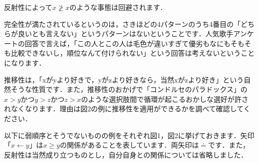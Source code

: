 反射性によって$x \not \geq x$のような事態は回避されます．

完全性が満たされているというのは，さきほどの4パターンのうち4番目の「どちらが良いとも言えない」というパターンはないということです．人気歌手アンケートの回答で言えば，「この人とこの人は毛色が違いすぎて優劣もなにもそもそも比較できないし，順位なんて付けられない」という回答は考えないということになります．

推移性は，「xがyより好きで，yがzより好きなら，当然xがzより好き」という自然そうな性質です．また，推移性のおかげで「コンドルセのパラドックス」の$x > y$かつ$y > z$かつ$z > x$のような選択肢間で循環が起こるおかしな選好が許されなくなります．理由は図2の例に推移性を適用ができるかを調べて確認してください．

以下に弱順序とそうでないものの例をそれぞれ図1，図2に挙げておきます．矢印「$x \leftarrow y$」は$x\geq y$の関係があることを表しています．両矢印は$\doteq$です．また，反射性は当然成り立つものとし，自分自身との関係については省略しました．
